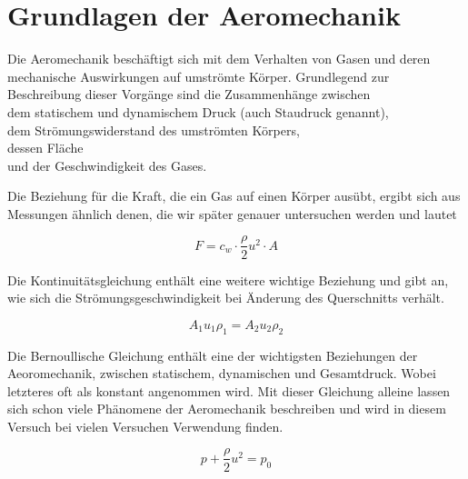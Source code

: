 \section{Grundlagen der Aeromechanik}

Die Aeromechanik beschäftigt sich mit dem Verhalten von Gasen und deren mechanische Auswirkungen auf umströmte Körper.
Grundlegend zur Beschreibung dieser Vorgänge sind die Zusammenhänge zwischen \\
dem statischem und dynamischem Druck (auch Staudruck genannt),\\
dem Strömungswiderstand des umströmten Körpers, \\
dessen Fläche\\
und der Geschwindigkeit des Gases.

Die Beziehung für die Kraft, die ein Gas auf einen Körper ausübt, ergibt sich aus Messungen ähnlich denen, die wir später genauer untersuchen werden und lautet

\begin{equation} \label{Kraft}
    F = c_w \cdot \frac{\rho}{2}u^2\cdot A
\end{equation}

Die Kontinuitätsgleichung enthält eine weitere wichtige Beziehung und gibt an, wie sich die Strömungsgeschwindigkeit bei Änderung des Querschnitts verhält.
    
\begin{equation} \label{Kontinuitaetsgleichung}
    A_1u_1\rho_1 = A_2u_2\rho_2
\end{equation}

Die Bernoullische Gleichung enthält eine der wichtigsten Beziehungen der Aeoromechanik, zwischen statischem, dynamischen und Gesamtdruck. Wobei letzteres oft als konstant angenommen wird. Mit dieser Gleichung alleine lassen sich schon viele Phänomene der Aeromechanik beschreiben und wird in diesem Versuch bei vielen Versuchen Verwendung finden.

\begin{equation} \label{Bernoullische Gleichung}
    p + \frac{\rho}{2}u^2 = p_0
\end{equation}